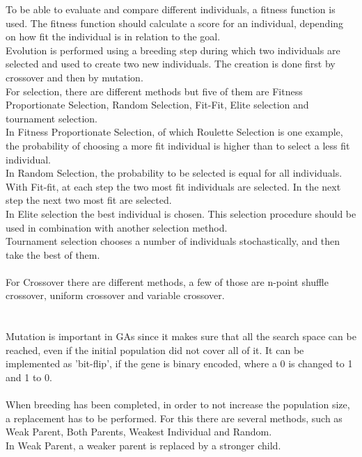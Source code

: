 To be able to evaluate and compare different individuals, a fitness function is used. The fitness function should calculate a score for an individual, depending on how fit the individual is in relation to the goal.\\
Evolution is performed using a breeding step during which two individuals are selected and used to create two new individuals. The creation is done first by crossover and then by mutation.\\
For selection, there are different methods but five of them are Fitness Proportionate Selection, Random Selection, Fit-Fit, Elite selection and tournament selection.\\
In Fitness Proportionate Selection, of which Roulette Selection is one example, the probability of choosing a more fit individual is higher than to select a less fit individual.\\
In Random Selection, the probability to be selected is equal for all individuals. \\
With Fit-fit, at each step the two most fit individuals are selected. In the next step the next two most fit are selected.\\
In Elite selection the best individual is chosen. This selection procedure should be used in combination with another selection method.\\
Tournament selection chooses a number of individuals stochastically, and then take the best of them.\\
\\
For Crossover there are different methods, a few of those are n-point shuffle crossover, uniform crossover and variable crossover.\\
\\
\\Mutation is important in GAs since it makes sure that all the search space can be reached, even if the initial population did not cover all of it. It can be implemented as 'bit-flip', if the gene is binary encoded, where a 0 is changed to 1 and 1 to 0.\\
\\
When breeding has been completed, in order to not increase the population size, a replacement has to be performed. For this there are several methods, such as Weak Parent, Both Parents, Weakest Individual and Random.\\
In Weak Parent, a weaker parent is replaced by a stronger child.\\
